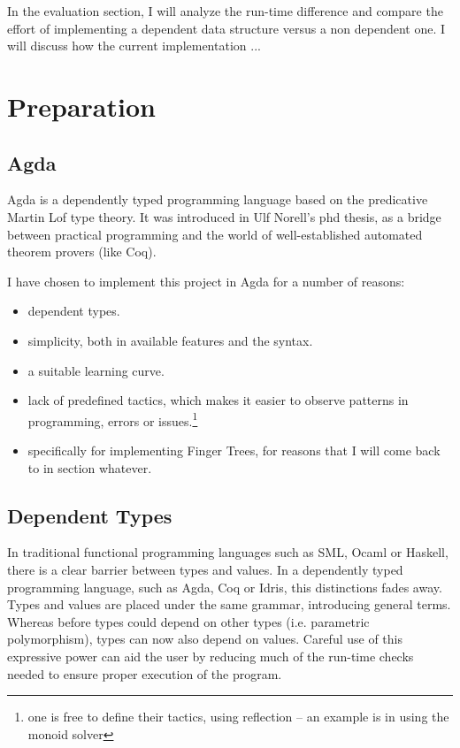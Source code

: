 \documentclass[12pt,twoside,notitlepage]{report}
\begin{document}
In the evaluation section, I will analyze the run-time difference and compare the effort of implementing a dependent data structure versus a non dependent one. I will discuss how the current implementation ... 
 
\chapter{Preparation}

\section{Agda}

Agda is a dependently typed programming language based on the predicative Martin Lof type theory. It was introduced in Ulf Norell’s phd thesis, as a bridge between practical programming and the world of well-established automated theorem provers (like Coq). 

I have chosen to implement this project in Agda for a number of reasons: 
\begin{itemize}

\item dependent types.
\item simplicity, both in available features and the syntax.
\item a suitable learning curve.
\item lack of predefined tactics, which makes it easier to observe patterns in programming, errors or issues.\footnote{one is free to define their tactics, using reflection  – an example is in using the monoid solver}
\item specifically for implementing Finger Trees, for reasons that I will come back to in section whatever.
\end{itemize}

\section{Dependent Types} 

In traditional functional programming languages such as SML, Ocaml or Haskell, there is a clear barrier between types and values. In a dependently typed programming language, such as Agda, Coq or Idris, this distinctions fades away. Types and values are placed under the same grammar, introducing general terms. Whereas before types could depend on other types (i.e. parametric polymorphism), types can now also depend on values.
Careful use of this expressive power can aid the user by reducing much of the run-time checks needed to ensure proper execution of the program. 
\end{document}
